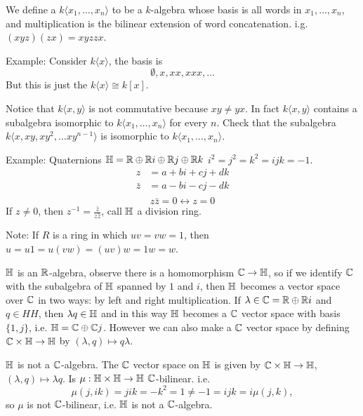   \begin{define}
    We define a  $k\langle x_1,\ldots,x_n\rangle$
    to be a $k$-algebra whose basis is all words in $x_1,\ldots,x_n$,
    and multiplication is the bilinear extension of word concatenation.
    i.g. $(xyz)(zx) = xyzzx$.
  \end{define}

  Example: Consider $k\langle x\rangle$, the basis is
  \[ \emptyset, x, xx, xxx, \ldots\]
  But this is just the $k\langle x \rangle \cong k[x]$.

  Notice that $k\langle x, y\rangle$ is not commutative because $xy \neq yx$.
  In fact $k\langle x, y\rangle$ contains a subalgebra isomorphic to
  $k\langle x_1, \ldots, x_n\rangle$ for every $n$. Check that the subalgebra
  $k\langle x, xy, xy^2, \ldots xy^{n-1} \rangle$ is isomorphic to
  $k\langle x_1, \ldots, x_n \rangle$.

  Example: Quaternions $\mathbb{H} = \mathbb{R} \oplus \mathbb{R} i \oplus \mathbb{R} j \oplus \mathbb{R} k$
  $i^2 = j^2 = k^2 = ijk = -1$.
  \begin{align*}
    z &= a + bi + cj + dk \\
    \bar{z} &= a - bi - cj - dk \\
  \end{align*}
  \[ z\bar{z} = 0 \longleftrightarrow  z = 0 \]
  If $z\neq 0$, then $z^{-1} = \frac{\bar{z}}{z\bar{z}}$, call $\mathbb{H}$ a division
  ring.

  Note: If $R$ is a ring in which $uv = vw = 1$, then
  $u = u1 = u(vw) = (uv)w = 1w = w$.

  $\mathbb{H}$ is an $\mathbb{R}$-algebra, observe there is a homomorphism $\mathbb{C}\to \mathbb{H}$, so
  if we identify $\mathbb{C}$ with the subalgebra of $\mathbb{H}$ spanned by $1$ and $i$,
  then $\mathbb{H}$ becomes a vector space over $\mathbb{C}$ in two ways: by left and right
  multiplication. If $\lambda \in \mathbb{C} = \mathbb{R} \oplus \mathbb{R} i$ and $q \in HH$, then
  $\lambda q \in \mathbb{H}$ and in this way $\mathbb{H}$ becomes a $\mathbb{C}$ vector space with
  basis $\{1,j\}$, i.e. $\mathbb{H} = \mathbb{C} \oplus \mathbb{C} j$. However we can also make a
  $\mathbb{C}$ vector space by defining  $\mathbb{C}\times \mathbb{H} \to \mathbb{H}$ by
  $(\lambda,q) \mapsto q \lambda$.

   $\mathbb{H}$ is not a $\mathbb{C}$-algebra. The $\mathbb{C}$ vector space on $\mathbb{H}$ is
  given by $\mathbb{C} \times \mathbb{H} \to \mathbb{H}$, $(\lambda, q) \mapsto \lambda q$. Is 
  $\mu:\mathbb{H} \times \mathbb{H} \to \mathbb{H}$ $\mathbb{C}$-bilinear. i.e.
  \[ \mu(j,ik) = jik = -k^2 = 1 \neq -1 = ijk = i\mu(j,k), \]
  so $\mu$ is not $\mathbb{C}$-bilinear, i.e. $\mathbb{H}$ is not a $\mathbb{C}$-algebra.


